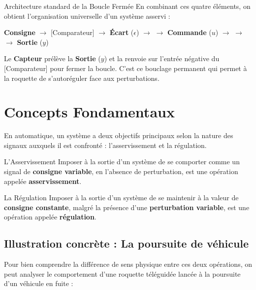 \documentclass[11pt,a4paper]{report}
\begin{document}
\begin{importantbox}{Architecture standard de la Boucle Fermée}
    En combinant ces quatre éléments, on obtient l'organisation universelle d'un système asservi :
    \begin{center}
        \textbf{Consigne} $\longrightarrow$ [Comparateur] $\longrightarrow$ \textbf{Écart} ($\epsilon$) $\longrightarrow$  $\longrightarrow$ \textbf{Commande} ($u$) $\longrightarrow$  $\longrightarrow$  $\longrightarrow$ \textbf{Sortie} ($y$)
    \end{center}
    Le \textbf{Capteur} prélève la \textbf{Sortie} ($y$) et la renvoie sur l'entrée négative du [Comparateur] pour fermer la boucle. C'est ce bouclage permanent qui permet à la roquette de s'autoréguler face aux perturbations.
\end{importantbox}

\section{Concepts Fondamentaux}

En automatique, un système a deux objectifs principaux selon la nature des signaux auxquels il est confronté : l'asservissement et la régulation.

\begin{defbox}{L'Asservissement}
Imposer à la sortie d'un système de se comporter comme un signal de \textbf{consigne variable}, en l'absence de perturbation, est une opération appelée \textbf{asservissement}.
\end{defbox}

\begin{defbox}{La Régulation}
Imposer à la sortie d'un système de se maintenir à la valeur de \textbf{consigne constante}, malgré la présence d'une \textbf{perturbation variable}, est une opération appelée \textbf{régulation}.
\end{defbox}

\subsection{Illustration concrète : La poursuite de véhicule}

Pour bien comprendre la différence de sens physique entre ces deux opérations, on peut analyser le comportement d'une roquette téléguidée lancée à la poursuite d'un véhicule en fuite :
\end{document}

